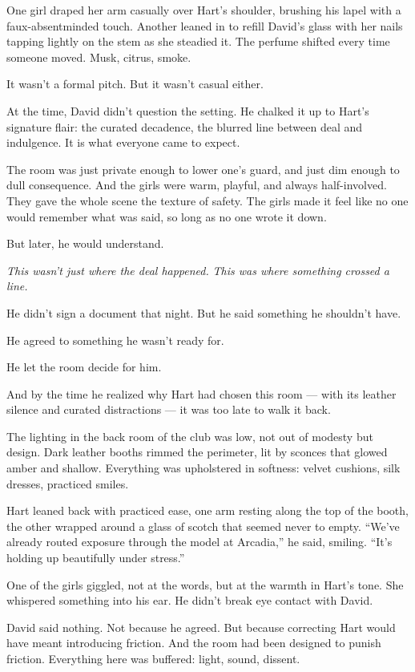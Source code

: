 \medskip


One girl draped her arm casually over Hart’s shoulder, brushing his lapel with a faux-absentminded touch.  
Another leaned in to refill David’s glass with her nails tapping lightly on the stem as she steadied it.  
The perfume shifted every time someone moved. Musk, citrus, smoke.  

It wasn’t a formal pitch. But it wasn’t casual either.

At the time, David didn’t question the setting.  
He chalked it up to Hart’s signature flair: the curated decadence, the blurred line between deal and indulgence.
It is what everyone came to expect.  

The room was just private enough to lower one’s guard, and just dim enough to dull consequence.  
And the girls were warm, playful, and always half-involved. 
They gave the whole scene the texture of safety.  
The girls made it feel like no one would remember what was said, so long as no one wrote it down.

But later, he would understand.

\textit{This wasn’t just where the deal happened.}  
\textit{This was where something crossed a line.}

He didn’t sign a document that night.  
But he said something he shouldn’t have.  

He agreed to something he wasn’t ready for.  

He let the room decide for him.

And by the time he realized why Hart had chosen this room —  
with its leather silence and curated distractions —  
it was too late to walk it back.

The lighting in the back room of the club was low, not out of modesty but design. Dark leather booths rimmed the perimeter, 
lit by sconces that glowed amber and shallow. Everything was upholstered in softness: velvet cushions, silk dresses, 
practiced smiles.

Hart leaned back with practiced ease, one arm resting along the top of the booth, the other wrapped around a glass of 
scotch that seemed never to empty. “We’ve already routed exposure through the model at Arcadia,” he said, smiling. 
“It’s holding up beautifully under stress.”

One of the girls giggled, not at the words, but at the warmth in Hart’s tone. She whispered something into his ear. 
He didn’t break eye contact with David.

David said nothing. Not because he agreed. But because correcting Hart would have meant introducing friction. And the 
room had been designed to punish friction. Everything here was buffered: light, sound, dissent.

